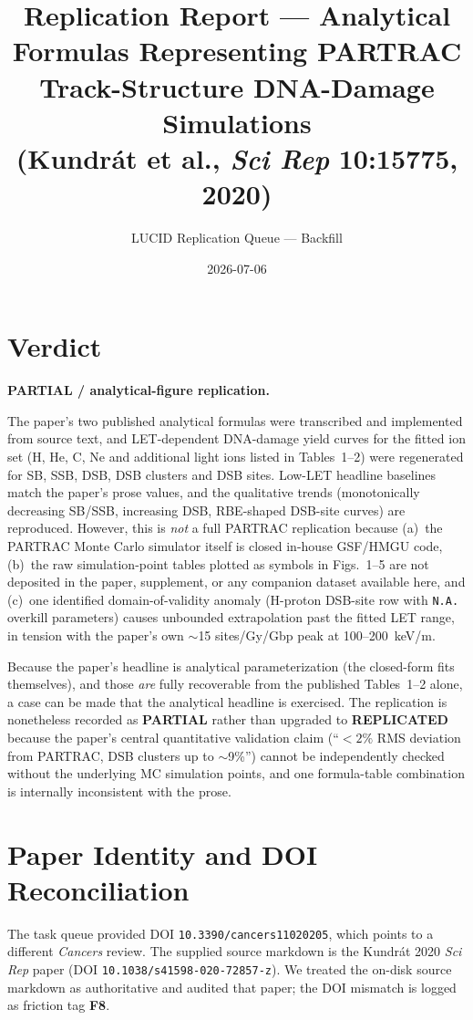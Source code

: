 \documentclass[11pt]{article}
\title{Replication Report --- Analytical Formulas Representing PARTRAC Track-Structure DNA-Damage Simulations \\ \large (Kundr\'at et al., \emph{Sci Rep} 10:15775, 2020)}
\author{LUCID Replication Queue --- Backfill}
\date{2026-07-06}
\begin{document}
\maketitle

\section*{Verdict}
\textbf{PARTIAL / analytical-figure replication.}

The paper's two published analytical formulas were transcribed and implemented from source text, and LET-dependent DNA-damage yield curves for the fitted ion set (H, He, C, Ne and additional light ions listed in Tables~1--2) were regenerated for SB, SSB, DSB, DSB clusters and DSB sites. Low-LET headline baselines match the paper's prose values, and the qualitative trends (monotonically decreasing SB/SSB, increasing DSB, RBE-shaped DSB-site curves) are reproduced. However, this is \emph{not} a full PARTRAC replication because (a)~the PARTRAC Monte Carlo simulator itself is closed in-house GSF/HMGU code, (b)~the raw simulation-point tables plotted as symbols in Figs.~1--5 are not deposited in the paper, supplement, or any companion dataset available here, and (c)~one identified domain-of-validity anomaly (H-proton DSB-site row with \texttt{N.A.} overkill parameters) causes unbounded extrapolation past the fitted LET range, in tension with the paper's own $\sim$15 sites/Gy/Gbp peak at 100--200~keV/\textmu m.

Because the paper's headline is analytical parameterization (the closed-form fits themselves), and those \emph{are} fully recoverable from the published Tables~1--2 alone, a case can be made that the analytical headline is exercised. The replication is nonetheless recorded as \textbf{PARTIAL} rather than upgraded to \textbf{REPLICATED} because the paper's central quantitative validation claim (``$<2\%$ RMS deviation from PARTRAC, DSB clusters up to $\sim$9\%'') cannot be independently checked without the underlying MC simulation points, and one formula-table combination is internally inconsistent with the prose.

\section{Paper Identity and DOI Reconciliation}

The task queue provided DOI \texttt{10.3390/cancers11020205}, which points to a different \emph{Cancers} review. The supplied source markdown is the Kundr\'at 2020 \emph{Sci Rep} paper (DOI \texttt{10.1038/s41598-020-72857-z}). We treated the on-disk source markdown as authoritative and audited that paper; the DOI mismatch is logged as friction tag \textbf{F8}.
\end{document}
